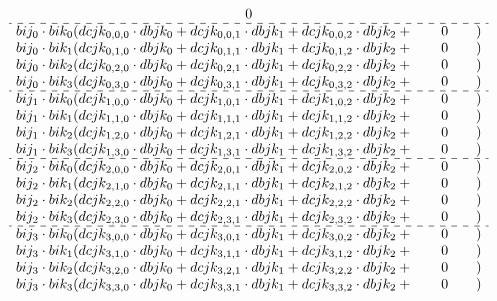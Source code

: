 \documentclass[12pt]{article}
\begin{document}
{$${\begin{array}{c}
0 \\
\hdashline
bij_0 \cdot bik_0 (dcjk_{0,0,0} \cdot dbjk_0 + dcjk_{0,0,1} \cdot dbjk_1 + dcjk_{0,0,2} \cdot dbjk_2 + \qquad 0\qquad)\\
bij_0 \cdot bik_1 (dcjk_{0,1,0} \cdot dbjk_0 + dcjk_{0,1,1} \cdot dbjk_1 + dcjk_{0,1,2} \cdot dbjk_2 + \qquad 0\qquad)\\
bij_0 \cdot bik_2 (dcjk_{0,2,0} \cdot dbjk_0 + dcjk_{0,2,1} \cdot dbjk_1 + dcjk_{0,2,2} \cdot dbjk_2 + \qquad 0\qquad)\\
bij_0 \cdot bik_3 (dcjk_{0,3,0} \cdot dbjk_0 + dcjk_{0,3,1} \cdot dbjk_1 + dcjk_{0,3,2} \cdot dbjk_2 + \qquad 0\qquad)\\
\hdashline
bij_1 \cdot bik_0 (dcjk_{1,0,0} \cdot dbjk_0 + dcjk_{1,0,1} \cdot dbjk_1 + dcjk_{1,0,2} \cdot dbjk_2 + \qquad 0\qquad)\\
bij_1 \cdot bik_1 (dcjk_{1,1,0} \cdot dbjk_0 + dcjk_{1,1,1} \cdot dbjk_1 + dcjk_{1,1,2} \cdot dbjk_2 + \qquad 0\qquad)\\
bij_1 \cdot bik_2 (dcjk_{1,2,0} \cdot dbjk_0 + dcjk_{1,2,1} \cdot dbjk_1 + dcjk_{1,2,2} \cdot dbjk_2 + \qquad 0\qquad)\\
bij_1 \cdot bik_3 (dcjk_{1,3,0} \cdot dbjk_0 + dcjk_{1,3,1} \cdot dbjk_1 + dcjk_{1,3,2} \cdot dbjk_2 + \qquad 0\qquad)\\
\hdashline
bij_2 \cdot bik_0 (dcjk_{2,0,0} \cdot dbjk_0 + dcjk_{2,0,1} \cdot dbjk_1 + dcjk_{2,0,2} \cdot dbjk_2 + \qquad 0\qquad)\\
bij_2 \cdot bik_1 (dcjk_{2,1,0} \cdot dbjk_0 + dcjk_{2,1,1} \cdot dbjk_1 + dcjk_{2,1,2} \cdot dbjk_2 + \qquad 0\qquad)\\
bij_2 \cdot bik_2 (dcjk_{2,2,0} \cdot dbjk_0 + dcjk_{2,2,1} \cdot dbjk_1 + dcjk_{2,2,2} \cdot dbjk_2 + \qquad 0\qquad)\\
bij_2 \cdot bik_3 (dcjk_{2,3,0} \cdot dbjk_0 + dcjk_{2,3,1} \cdot dbjk_1 + dcjk_{2,3,2} \cdot dbjk_2 + \qquad 0\qquad)\\
\hdashline
bij_3 \cdot bik_0 (dcjk_{3,0,0} \cdot dbjk_0 + dcjk_{3,0,1} \cdot dbjk_1 + dcjk_{3,0,2} \cdot dbjk_2 + \qquad 0\qquad)\\
bij_3 \cdot bik_1 (dcjk_{3,1,0} \cdot dbjk_0 + dcjk_{3,1,1} \cdot dbjk_1 + dcjk_{3,1,2} \cdot dbjk_2 + \qquad 0\qquad)\\
bij_3 \cdot bik_2 (dcjk_{3,2,0} \cdot dbjk_0 + dcjk_{3,2,1} \cdot dbjk_1 + dcjk_{3,2,2} \cdot dbjk_2 + \qquad 0\qquad)\\
bij_3 \cdot bik_3 (dcjk_{3,3,0} \cdot dbjk_0 + dcjk_{3,3,1} \cdot dbjk_1 + dcjk_{3,3,2} \cdot dbjk_2 + \qquad 0\qquad)\\

\end{array}}$$}
\end{document}
